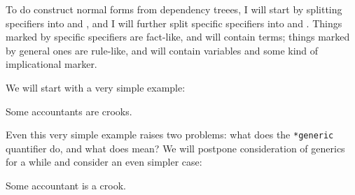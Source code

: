 \documentclass[11pt,a4paper]{article}
\begin{document}
To do construct normal forms from dependency treees, I will start by splitting
specifiers into  and , and I will further
split specific specifiers into  and
. Things marked by
specific specifiers are fact-like, and will contain terms; things marked by general ones are
rule-like, and will contain variables and some kind of implicational marker.

We will start with a very simple example:

\begin{examples}
\item Some accountants are crooks.
\end{examples}

\begin{figure}[ht]
\hspace*{\fill}
\begin{minipage}[t]{0.45\linewidth}

\end{minipage}
\hspace*{\fill}
\caption{}\label{some accountants are crooks .}
\end{figure}

Even this very simple example raises two problems: what does the
\texttt{*generic} quantifier do, and what does  mean? We will
postpone consideration of generics for a while and consider an even
simpler case:

\begin{examples}
\item \label{SAIAC}
Some accountant is a crook.
\end{examples}
\end{document}
